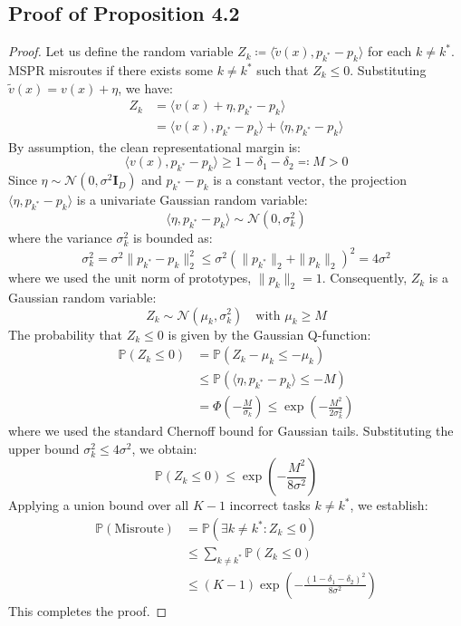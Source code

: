 \documentclass{article}
\theoremstyle{plain}
\theoremstyle{definition}
\theoremstyle{remark}
\begin{document}
\subsection{Proof of Proposition 4.2}
\label{proof-proposition}
\begin{proof}
Let us define the random variable $Z_k \coloneqq \langle \tilde{v}(x), p_{k^*} - p_k \rangle$ for each $k \neq k^*$. MSPR misroutes if there exists some $k \neq k^*$ such that $Z_k \le 0$. Substituting $\tilde{v}(x) = v(x) + \eta$, we have:
\begin{align*}
Z_k &= \langle v(x) + \eta, p_{k^*} - p_k \rangle \\
&= \langle v(x), p_{k^*} - p_k \rangle + \langle \eta, p_{k^*} - p_k \rangle
\end{align*}
By assumption, the clean representational margin is:
\begin{equation*}
\langle v(x), p_{k^*} - p_k \rangle \ge 1 - \delta_1 - \delta_2 \eqqcolon M > 0
\end{equation*}
Since $\eta \sim \mathcal{N}(0, \sigma^2 \mathbf{I}_D)$ and $p_{k^*} - p_k$ is a constant vector, the projection $\langle \eta, p_{k^*} - p_k \rangle$ is a univariate Gaussian random variable:
\begin{equation*}
\langle \eta, p_{k^*} - p_k \rangle \sim \mathcal{N}(0, \sigma_k^2)
\end{equation*}
where the variance $\sigma_k^2$ is bounded as:
\begin{equation*}
\sigma_k^2 = \sigma^2 \|p_{k^*} - p_k\|_2^2 \le \sigma^2 (\|p_{k^*}\|_2 + \|p_k\|_2)^2 = 4\sigma^2
\end{equation*}
where we used the unit norm of prototypes, $\|p_k\|_2 = 1$. Consequently, $Z_k$ is a Gaussian random variable:
\begin{equation*}
Z_k \sim \mathcal{N}(\mu_k, \sigma_k^2) \quad \text{with } \mu_k \ge M
\end{equation*}
The probability that $Z_k \le 0$ is given by the Gaussian Q-function:
\begin{align*}
\mathbb{P}(Z_k \le 0) &= \mathbb{P}(Z_k - \mu_k \le - \mu_k) \\
&\le \mathbb{P}(\langle \eta, p_{k^*} - p_k \rangle \le - M) \\
&= \Phi\left( -\frac{M}{\sigma_k} \right) \le \exp\left( -\frac{M^2}{2 \sigma_k^2} \right)
\end{align*}
where we used the standard Chernoff bound for Gaussian tails. Substituting the upper bound $\sigma_k^2 \le 4\sigma^2$, we obtain:
\begin{equation*}
\mathbb{P}(Z_k \le 0) \le \exp\left( -\frac{M^2}{8\sigma^2} \right)
\end{equation*}
Applying a union bound over all $K-1$ incorrect tasks $k \neq k^*$, we establish:
\begin{align*}
\mathbb{P}(\text{Misroute}) &= \mathbb{P}(\exists k \neq k^* : Z_k \le 0) \\
&\le \sum_{k \neq k^*} \mathbb{P}(Z_k \le 0) \\
&\le (K-1) \exp\left( - \frac{(1 - \delta_1 - \delta_2)^2}{8 \sigma^2} \right)
\end{align*}
This completes the proof.
\end{proof}
\end{document}
